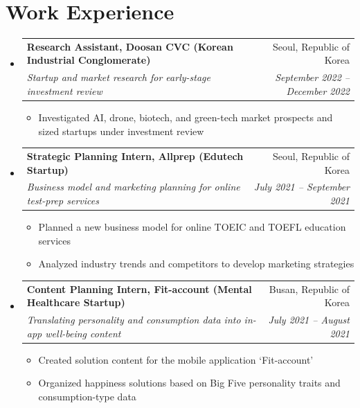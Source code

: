 \documentclass[letterpaper,10pt]{article}
\makeatletter
\newcommand{\ENTRYSEP}{0.4em}\newcommand{\PLAINSEP}{0.3em}
\newcommand{\DETSEP}{0.14em}\newcommand{\TOPSEP}{0.35em}
\newcommand{\ENTRYDROP}{-0.15em}
\newcommand{\ENTRYSEP}{0.18em}\newcommand{\PLAINSEP}{0.15em}
\newcommand{\DETSEP}{0.06em}\newcommand{\TOPSEP}{0.18em}
\newcommand{\ENTRYDROP}{-0.35em}
\let\oldsection\section
\renewcommand{\section}[1]{\needspace{8\baselineskip}\oldsection{#1}}
\newcommand{\entry}[4]{%
  \needspace{3.2\baselineskip}\item
  \begin{tabularx}{\linewidth}[t]{@{}>{\raggedright\arraybackslash}X@{\hspace{1.2em}}r@{}}
    \textbf{#1} & #2 \\[0.05em]
    \textit{\small #3} & \textit{\small #4} \\
  \end{tabularx}\vspace{\ENTRYDROP}%
}
\newenvironment{entries}
  {\begin{itemize}[leftmargin=1.2em, itemsep=\ENTRYSEP, parsep=0pt, topsep=\TOPSEP]}
  {\end{itemize}}
\newenvironment{details}
  {\begin{itemize}[label=$\circ$, leftmargin=1.4em, itemsep=\DETSEP, parsep=0pt, topsep=\TOPSEP]}
  {\end{itemize}\vspace{-0.2em}}
\makeatother
\begin{document}
\section{Work Experience}
\begin{entries}
  \entry{Research Assistant, Doosan CVC (Korean Industrial Conglomerate)}{Seoul, Republic of Korea}
        {Startup and market research for early-stage investment review}{September 2022 -- December 2022}
  \begin{details}
    \item Investigated AI, drone, biotech, and green-tech market prospects and sized startups
          under investment review
  \end{details}

  \entry{Strategic Planning Intern, Allprep (Edutech Startup)}{Seoul, Republic of Korea}
        {Business model and marketing planning for online test-prep services}{July 2021 -- September 2021}
  \begin{details}
    \item Planned a new business model for online TOEIC and TOEFL education services
    \item Analyzed industry trends and competitors to develop marketing strategies
  \end{details}

  \entry{Content Planning Intern, Fit-account (Mental Healthcare Startup)}{Busan, Republic of Korea}
        {Translating personality and consumption data into in-app well-being content}{July 2021 -- August 2021}
  \begin{details}
    \item Created solution content for the mobile application `Fit-account'
    \item Organized happiness solutions based on Big Five personality traits and
          consumption-type data
  \end{details}
\end{entries}

\end{document}
